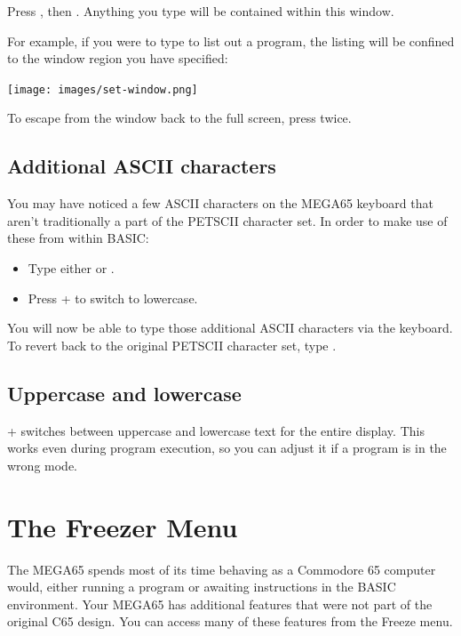 Press , then . Anything you type will be contained within this window.

For example, if you were to type  to list out a program, the listing will be confined to the window region you have specified:

\begin{center}
\texttt{[image: images/set-window.png]}
\end{center}

To escape from the window back to the full screen, press  twice.

\subsection{Additional ASCII characters}

You may have noticed a few ASCII characters on the MEGA65 keyboard that aren't traditionally a part of the PETSCII character set. In order to make use of these from within BASIC:

\begin{itemize}
  \item Type either  or .
  \item Press \megasymbolkey +  to switch to lowercase.
\end{itemize}

You will now be able to type those additional ASCII characters via the keyboard. To revert back to the original PETSCII character set, type .

\subsection{Uppercase and lowercase}

\megasymbolkey +  switches between uppercase and lowercase text for the entire display. This works even during program execution, so you can adjust it if a program is in the wrong mode.


\section{The Freezer Menu}
\label{sec:freezer}

The MEGA65 spends most of its time behaving as a Commodore 65 computer would, either running a program or awaiting instructions in the BASIC environment. Your MEGA65 has additional features that were not part of the original C65 design. You can access many of these features from the Freeze menu.

